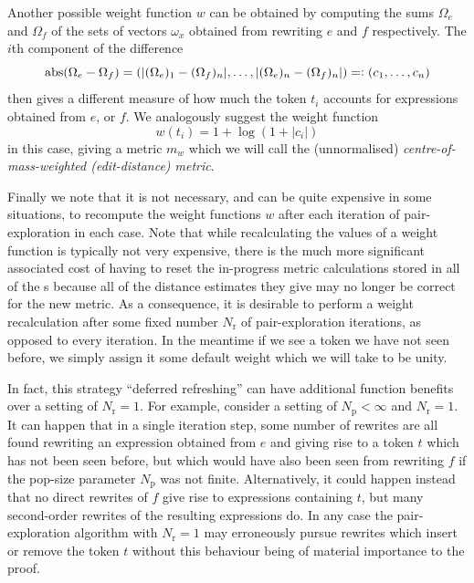 \documentclass[12pt]{article}
\begin{document}
Another possible weight function $w$ can be obtained by computing the sums $\Omega_e$ and $\Omega_f$ of the sets of vectors $\omega_x$ obtained from rewriting $e$ and $f$ respectively. The $i$th component of the difference
\begin{equation*}
  \operatorname{abs}(\Omega_e - \Omega_f) = (\lvert (\Omega_e)_1 - (\Omega_f)_n \rvert, \ldots, \lvert (\Omega_e)_n - (\Omega_f)_n \rvert) =: (c_1, \ldots, c_n)
\end{equation*}
then gives a different measure of how much the token $t_i$ accounts for expressions obtained from $e$, or $f$. We analogously suggest the weight function
\begin{equation*}
  w(t_i) = 1 + \log(1 + \lvert c_i \rvert)
\end{equation*}
in this case, giving a metric $m_w$ which we will call the (unnormalised) \textit{centre-of-mass-weighted (edit-distance) metric}.

Finally we note that it is not necessary, and can be quite expensive in some situations, to recompute the weight functions $w$ after each iteration of pair-exploration in each case. Note that while recalculating the values of a weight function is typically not very expensive, there is the much more significant associated cost of having to reset the in-progress metric calculations stored in all of the s because all of the distance estimates they give may no longer be correct for the new metric. As a consequence, it is desirable to perform a weight recalculation after some fixed number $N_\text{r}$ of pair-exploration iterations, as opposed to every iteration. In the meantime if we see a token we have not seen before, we simply assign it some default weight which we will take to be unity.

In fact, this strategy ``deferred refreshing'' can have additional function benefits over a setting of $N_\text{r} = 1$. For example, consider a setting of $N_\text{p} < \infty$ and $N_\text{r} = 1$. It can happen that in a single iteration step, some number of rewrites are all found rewriting an expression obtained from $e$ and giving rise to a token $t$ which has not been seen before, but which would have also been seen from rewriting $f$ if the pop-size parameter $N_\text{p}$ was not finite. Alternatively, it could happen instead that no direct rewrites of $f$ give rise to expressions containing $t$, but many second-order rewrites of the resulting expressions do. In any case the pair-exploration algorithm with $N_\text{r} = 1$ may erroneously pursue rewrites which insert or remove the token $t$ without this behaviour being of material importance to the proof.
\end{document}
